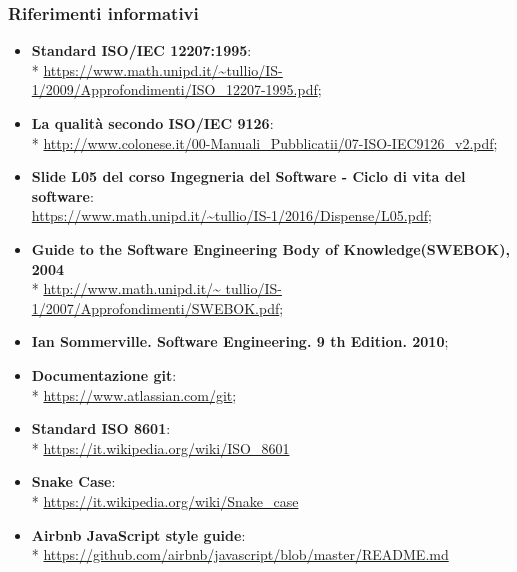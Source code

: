 \subsubsection{Riferimenti informativi}
\begin{itemize}
	\item \textbf{ Standard ISO/IEC 12207:1995}:\\* 
	\url{https://www.math.unipd.it/~tullio/IS-1/2009/Approfondimenti/ISO_12207-1995.pdf};
	\item \textbf{La qualità secondo ISO/IEC 9126}: \\*
	\url{http://www.colonese.it/00-Manuali_Pubblicatii/07-ISO-IEC9126_v2.pdf};
	\item \textbf{Slide L05 del corso Ingegneria del Software - Ciclo di vita 
	del software}:\\
		\url{https://www.math.unipd.it/~tullio/IS-1/2016/Dispense/L05.pdf};
	\item \textbf{Guide to the Software Engineering Body of Knowledge(SWEBOK), 2004} \\*
		\url{http://www.math.unipd.it/~	tullio/IS-1/2007/Approfondimenti/SWEBOK.pdf};
	\item \textbf{Ian Sommerville. Software Engineering. 9 th Edition. 2010};
	\item \textbf{Documentazione git}: \\*
		\url{https://www.atlassian.com/git};
	\item \textbf{Standard ISO 8601}: \\*
		\url{https://it.wikipedia.org/wiki/ISO_8601}
	\item \textbf{Snake Case}\glo: \\*
		\url{https://it.wikipedia.org/wiki/Snake_case}
	\item \textbf{Airbnb JavaScript style guide}: \\*
		\url{https://github.com/airbnb/javascript/blob/master/README.md}
	
	
	
	
\end{itemize}
